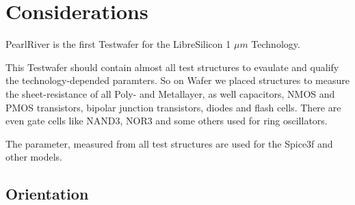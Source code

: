 \section{Considerations}

PearlRiver is the first Testwafer for the LibreSilicon 1 $ \mu m$ Technology.

This Testwafer should contain almost all test structures to evaulate and qualify the technology-depended paramters. So on Wafer we placed structures to measure the sheet-resistance of all Poly- and Metallayer, as well capacitors, NMOS and PMOS transistors, bipolar junction transistors, diodes and flash cells. There are even gate cells like NAND3, NOR3 and some others used for ring oscillators.

The parameter, measured from all test structures are used for the Spice3f and other models.


\subsection{Orientation}


